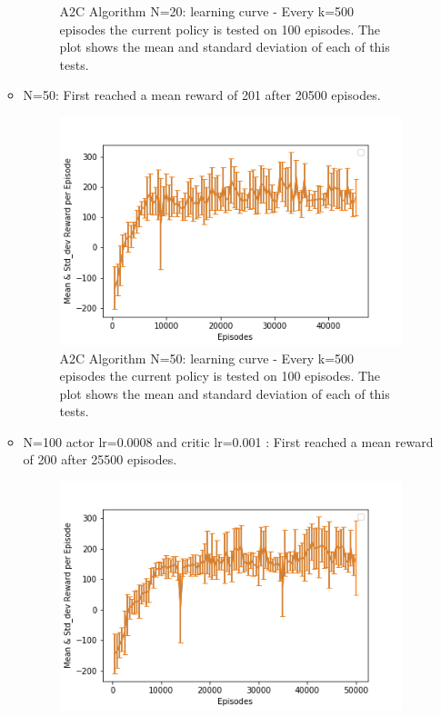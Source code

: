 \documentclass[12pt]{article}
\begin{document}
\begin{enumerate}
\begin{itemize}
\begin{figure}[H]
\begin{center}
				\end{center}
				\caption{A2C Algorithm N=20: learning curve - Every k=500 episodes the current policy is tested on 100 episodes. The plot shows the mean and standard deviation of each of this tests.  } 	\label{3}%
			\end{figure}
			\item N=50:   First reached a mean reward of 201 after 20500 episodes.
			\begin{figure}[H]
				\begin{center} 
					\includegraphics[scale=.73]{figures/A2C_LC_N=50_45.png}
				\end{center}
				\caption{A2C Algorithm N=50: learning curve - Every k=500 episodes the current policy is tested on 100 episodes. The plot shows the mean and standard deviation of each of this tests.  } 	\label{4}%
			\end{figure}
			\item N=100 actor lr=0.0008 and critic lr=0.001 :  First reached a mean reward of 200 after 25500 episodes.
			\begin{figure}[H]
				\begin{center} 
					\includegraphics[scale=.73]{figures/A2C_LC_N=100_50.png}

\end{center}
\end{figure}
\end{itemize}
\end{enumerate}
\end{document}
